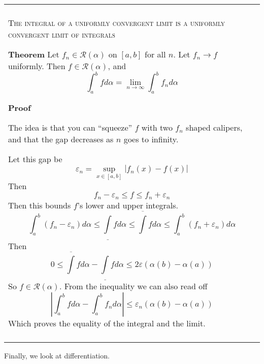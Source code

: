 \documentclass{article}
\newenvironment{myboxed}{\bigskip\noindent\begin{tabular}{|p{.975\linewidth}|}\hline \\}{\\\\\hline\end{tabular}\bigskip}
\begin{document}
\begin{myboxed}
    \textsc{The integral of a uniformly convergent limit is a uniformly convergent limit of integrals}

    \textbf{Theorem}
    Let $f_n \in \mathscr{R}(\alpha)$ on $[a, b]$ for all $n$. Let $f_n \rightarrow f$ uniformly. Then $f \in \mathscr{R}(\alpha)$, and
    \[\int_a^b f d\alpha = \lim_{n \to \infty} \int_a^b f_n d\alpha\]

    \textbf{Proof}

    The idea is that you can ``squeeze'' $f$ with two $f_n$ shaped calipers, and that the gap decreases as $n$ goes to infinity.

    Let this gap be 
    \[\varepsilon_n = \sup_{x \in [a,b]} |f_n(x) - f(x)|\]
    Then
    \[f_n - \varepsilon_n \leq f \leq f_n + \varepsilon_n\]
    Then this bounds $f$'s lower and upper integrals.
    \[\int_a^b (f_n-\varepsilon_n) d\alpha \leq \underline{\int} f d\alpha \leq \overline{\int} f d\alpha \leq \int_a^b (f_n+\varepsilon_n) d\alpha\]
    Then
    \[0 \leq \overline{\int} f d\alpha - \underline{\int} fd\alpha \leq 2 \varepsilon(\alpha(b) - \alpha(a)) \]
    So $f \in \mathscr{R}(\alpha)$. From the inequality we can also read off 
    \[\left| \int_a^b fd\alpha - \int_a^b f_nd\alpha\right| \leq \varepsilon_n (\alpha(b) - \alpha(a))\]
    Which proves the equality of the integral and the limit.
\end{myboxed}

\newpage
    
Finally, we look at differentiation.
\end{document}
